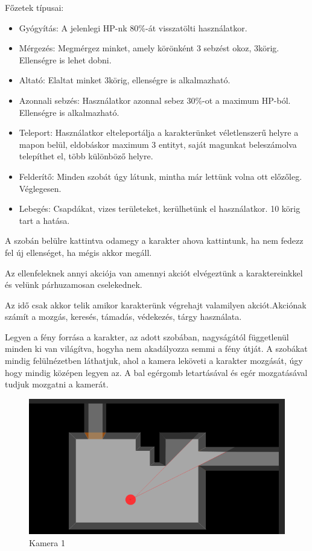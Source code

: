 Főzetek típusai:
\begin{itemize}
\item Gyógyítás: A jelenlegi HP-nk 80\%-át visszatölti használatkor.
\item Mérgezés: Megmérgez minket, amely körönként 3 sebzést okoz, 3körig. Ellenségre is lehet dobni.
\item Altató: Elaltat minket 3körig, ellenségre is alkalmazható.
\item Azonnali sebzés: Használatkor azonnal sebez 30\%-ot a maximum HP-ból. Ellenségre is alkalmazható.
\item Teleport: Használatkor elteleportálja a karakterünket véletlenszerű helyre a mapon belül, eldobáskor maximum 3 entityt, saját magunkat beleszámolva telepíthet el, több különböző helyre.
\item Felderítő: Minden szobát úgy látunk, mintha már lettünk volna ott előzőleg. Véglegesen.
\item Lebegés: Csapdákat, vizes területeket, kerülhetünk el használatkor. 10 körig tart a hatása.
\end{itemize}


A szobán belülre kattintva odamegy a karakter ahova kattintunk, ha nem fedezz fel új ellenséget, ha mégis akkor megáll.

Az ellenfeleknek annyi akciója van amennyi akciót elvégeztünk a karaktereinkkel és velünk párhuzamosan cselekednek.

Az idő csak akkor telik amikor karakterünk végrehajt valamilyen akciót.Akciónak számít a mozgás, keresés, támadás, védekezés, tárgy használata.


Legyen a fény forrása a karakter, az adott szobában, nagyságától függetlenül minden ki van világítva, hogyha nem akadályozza semmi a fény útját.
A szobákat mindig felülnézetben láthatjuk, ahol a kamera leköveti a karakter mozgását, úgy hogy mindig középen legyen az.
A bal egérgomb letartásával és egér mozgatásával tudjuk mozgatni a kamerát.

\begin{figure}[!ht]
	\centering
	\includegraphics[scale=1]{images/image6.png}
	\caption{Kamera 1}
	\label{fig:camera1}
\end{figure}

